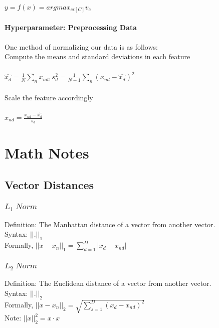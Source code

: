 \documentclass{article}
\begin{document}
\paragraph{}
\(y=f(x)=argmax_{c\epsilon[C]}v_c\)
\paragraph{Hyperparameter: Preprocessing Data}
\paragraph{}
One method of normalizing our data is as follows:\\
Compute the means and standard deviations in each feature
\paragraph{}
\(\hat{x_d} = \frac{1}{N}\sum_nx_{nd}, s_d^2=\frac{1}{N-1}\sum_n(x_{nd}-\hat{x_d})^2\)\\\\
Scale the feature accordingly
\paragraph{}
\(x_{nd} = \frac{x_{nd}-\hat{x_d}}{s_d}\)


\section{Math Notes}
\subsection{Vector Distances}
\subsubsection{$L_1\;Norm$}
Definition: The Manhattan distance of a vector from another vector.\\
Syntax: $||.||_1$\\
Formally, $||x-x_n||_1 = \sum^D_{d=1}{|x_d - x_{nd}|}$

\subsubsection{$L_2\;Norm$}
Definition: The Euclidean distance of a vector from another vector.\\
Syntax: $||.||_2$\\
Formally, $||x-x_n||_2 = \sqrt{\sum^D_{s=1}{(x_d - x_{nd})^2}}$\\
Note: $||x||_2^2 = x \cdot x $
\end{document}
